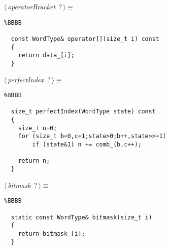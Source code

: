 \documentclass{report}
\begin{document}
\begin{flushleft} \small
\begin{minipage}{\linewidth}\label{scrap9}\raggedright\small
{} $\langle\,${\it operatorBracket}\nobreak\ {\footnotesize {?}}$\,\rangle\equiv$
\begin{lstlisting}%BBBB
    
  const WordType& operator[](size_t i) const  
  {  
  	return data_[i];  
  }  \end{lstlisting}
\end{minipage}\vspace{4ex}
\end{flushleft}
\begin{flushleft} \small
\begin{minipage}{\linewidth}\label{scrap10}\raggedright\small
{} $\langle\,${\it perfectIndex}\nobreak\ {\footnotesize {?}}$\,\rangle\equiv$
\begin{lstlisting}%BBBB
    
  size_t perfectIndex(WordType state) const  
  {  
  	size_t n=0;  
  	for (size_t b=0,c=1;state>0;b++,state>>=1)  
  		if (state&1) n += comb_(b,c++);  
    
  	return n;  
  }  \end{lstlisting}
\end{minipage}\vspace{4ex}
\end{flushleft}
\begin{flushleft} \small
\begin{minipage}{\linewidth}\label{scrap11}\raggedright\small
{} $\langle\,${\it bitmask}\nobreak\ {\footnotesize {?}}$\,\rangle\equiv$
\begin{lstlisting}%BBBB
    
  static const WordType& bitmask(size_t i)  
  {  
  	return bitmask_[i];  
  }  \end{lstlisting}
\end{minipage}\vspace{4ex}
\end{flushleft}
\end{document}
